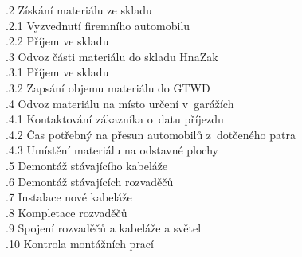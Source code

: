 \documentclass[a4paper, twoside, 11pt]{article}
\begin{document}
		\indent {}.2 Získání materiálu ze skladu\\
			\indent \indent {}.2.1 Vyzvednutí firemního automobilu\\
			\indent \indent {}.2.2 Příjem ve skladu\\
		\indent {}.3 Odvoz části materiálu do skladu HnaZak\\
			\indent \indent {}.3.1 Příjem ve skladu\\
			\indent \indent {}.3.2 Zapsání objemu materiálu do GTWD\\
		\indent {}.4 Odvoz materiálu na místo určení v~garážích\\
			\indent \indent {}.4.1 Kontaktování zákazníka o~datu příjezdu\\
			\indent \indent {}.4.2 Čas potřebný na přesun automobilů z~dotčeného patra\\
			\indent \indent {}.4.3 Umístění materiálu na odstavné plochy\\
		\indent {}.5 Demontáž stávajícího kabeláže\\
		\indent {}.6 Demontáž stávajících rozvaděčů\\
		\indent {}.7 Instalace nové kabeláže\\
		\indent {}.8 Kompletace rozvaděčů\\
		\indent {}.9 Spojení rozvaděčů a kabeláže a světel\\
		\indent {}.10 Kontrola montážních prací\\
		
\end{document}
